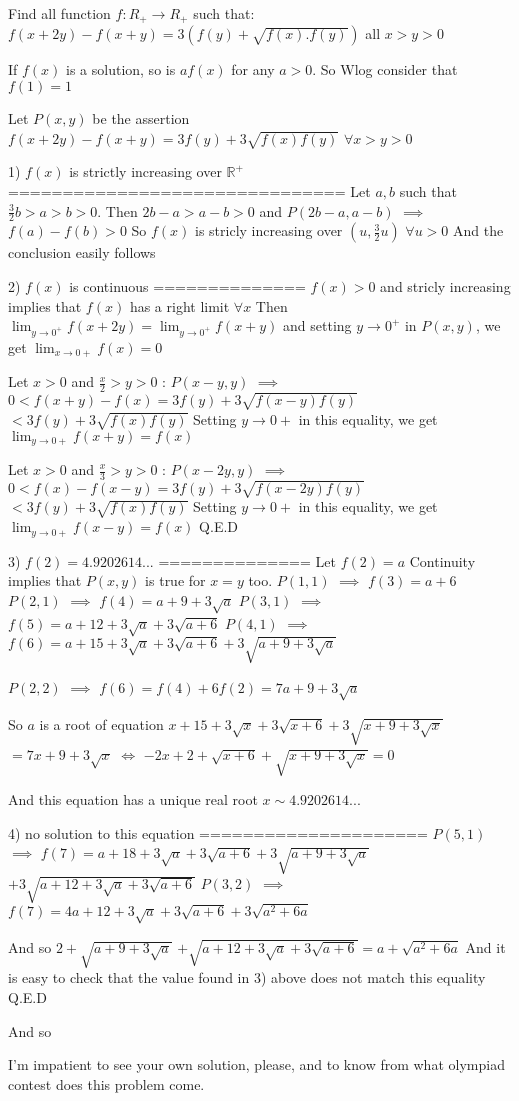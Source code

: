 \begin{solution}
	\begin{tcolorbox}Find all function $f: R_{+} \to R_{+}$ such that:
$f(x+2y)-f(x+y)=3(f(y)+\sqrt{f(x).f(y)})$ all $x>y>0$\end{tcolorbox}
If $f(x)$ is a solution, so is $af(x)$ for any $a>0$. So Wlog consider that $f(1)=1$

Let $P(x,y)$ be the assertion $f(x+2y)-f(x+y)=3f(y)+3\sqrt{f(x)f(y)}$ $\forall x>y>0$

1) $f(x)$ is strictly increasing over $\mathbb R^+$
===============================
Let $a,b$ such that $\frac 32b>a>b>0$. Then $2b-a>a-b>0$ and $P(2b-a,a-b)$ $\implies$ $f(a)-f(b)>0$
So $f(x)$ is stricly increasing over $(u,\frac 32u)$ $\forall u>0$
And the conclusion easily follows

2) $f(x)$ is continuous
==============
$f(x)>0$ and stricly increasing implies that $f(x)$ has a right limit $\forall x$
Then $\lim_{y\to 0^+}f(x+2y)=\lim_{y\to 0^+}f(x+y)$ and setting $y\to 0^+$ in $P(x,y)$, we get $\lim_{x\to 0+}f(x)=0$

Let $x>0$ and $\frac x2>y>0$ : $P(x-y,y)$ $\implies$ $0<f(x+y)-f(x)=3f(y)+3\sqrt{f(x-y)f(y)}$ $<3f(y)+3\sqrt{f(x)f(y)}$
Setting $y\to 0+$ in this equality, we get $\lim_{y\to 0+}f(x+y)=f(x)$

Let $x>0$ and $\frac x3>y>0$ : $P(x-2y,y)$ $\implies$ $0<f(x)-f(x-y)=3f(y)+3\sqrt{f(x-2y)f(y)}$ $<3f(y)+3\sqrt{f(x)f(y)}$
Setting $y\to 0+$ in this equality, we get $\lim_{y\to 0+}f(x-y)=f(x)$
Q.E.D

3) $f(2)=4.9202614...$
==============
Let $f(2)=a$
Continuity implies that $P(x,y)$ is true for $x=y$ too.
$P(1,1)$ $\implies$ $f(3)=a+6$
$P(2,1)$ $\implies$ $f(4)=a+9+3\sqrt a$
$P(3,1)$ $\implies$ $f(5)=a+12+3\sqrt a+3\sqrt{a+6}$
$P(4,1)$ $\implies$ $f(6)=a+15+3\sqrt a +3\sqrt{a+6}+3\sqrt{a+9+3\sqrt a}$

$P(2,2)$ $\implies$ $f(6)=f(4)+6f(2)=7a+9+3\sqrt a$

So $a$ is a root of equation $x+15+3\sqrt x +3\sqrt{x+6}+3\sqrt{x+9+3\sqrt x}$ $=7x+9+3\sqrt x$
$\iff$ $-2x+2+\sqrt{x+6}+\sqrt{x+9+3\sqrt x}=0$

And this equation has a unique real root $x\sim 4.9202614...$

4) no solution to this equation
=====================
$P(5,1)$ $\implies$ $f(7)=a+18+3\sqrt a +3\sqrt{a+6}+3\sqrt{a+9+3\sqrt a}$ $+3\sqrt{a+12+3\sqrt a+3\sqrt{a+6}}$
$P(3,2)$ $\implies$ $f(7)=4a+12+3\sqrt a+3\sqrt{a+6}+3\sqrt{a^2+6a}$

And so $2+\sqrt{a+9+3\sqrt a}$ $+\sqrt{a+12+3\sqrt a+3\sqrt{a+6}}=a+\sqrt{a^2+6a}$
And it is easy to check that the value found in 3) above does not match this equality
Q.E.D

And so 

I'm impatient to see your own solution, please, and to know from what olympiad contest does this problem come.
\end{solution}



